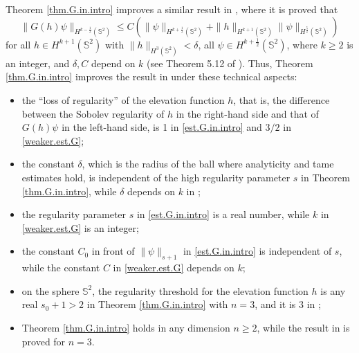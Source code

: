 \documentclass[10pt,reqno,a4paper]{article}
\numberwithin{equation}{section}
\theoremstyle{plain}
\theoremstyle{definition}
\renewcommand{\S}{{\mathbb S}}
\begin{document}
Theorem \ref{thm.G.in.intro} improves a similar result in \cite{BJL}, where it is proved that 
\begin{equation} \label{weaker.est.G}
\| G(h)\psi \|_{H^{k-\frac12}(\S^2)} 
\leq C ( \| \psi \|_{H^{k+\frac12}(\S^2)} 
+ \| h \|_{H^{k+1}(\S^2)} \| \psi \|_{H^{\frac52}(\S^2)})
\end{equation}
for all $h \in H^{k+1}(\S^2)$ with $\| h \|_{H^3(\S^2)} < \delta$, 
all $\psi \in H^{k+\frac12}(\S^2)$, 
where $k \geq 2$ is an integer, and $\delta, C$ depend on $k$
(see Theorem 5.12 of \cite{BJL}).
Thus, Theorem \ref{thm.G.in.intro} improves the result in \cite{BJL} 
under these technical aspects: 
\begin{itemize}

\item 
the ``loss of regularity'' of the elevation function $h$,  
that is, the difference between the Sobolev regularity of $h$ in the right-hand side 
and that of $G(h)\psi$ in the left-hand side, 
is 1 in \eqref{est.G.in.intro} 
and $3/2$ in \eqref{weaker.est.G};

\item 
the constant $\delta$, which is the radius of the ball where analyticity and tame estimates hold, 
is independent of the high regularity parameter $s$ in Theorem \ref{thm.G.in.intro}, 
while $\delta$ depends on $k$ in \cite{BJL};

\item 
the regularity parameter $s$ in \eqref{est.G.in.intro} 
is a real number, while $k$ in \eqref{weaker.est.G} is an integer;

\item 
the constant $C_0$ in front of $\| \psi \|_{s+1}$ in \eqref{est.G.in.intro} is independent of $s$, 
while the constant $C$ in \eqref{weaker.est.G} depends on $k$;

\item 
on the sphere $\S^2$, the regularity threshold for the elevation function $h$ 
is any real $s_0 + 1 > 2$ in Theorem \ref{thm.G.in.intro} with $n=3$, 
and it is $3$ in \cite{BJL};

\item 
Theorem \ref{thm.G.in.intro} holds in any dimension $n \geq 2$, 
while the result in \cite{BJL} is proved for $n=3$. 
\end{itemize}
\end{document}
